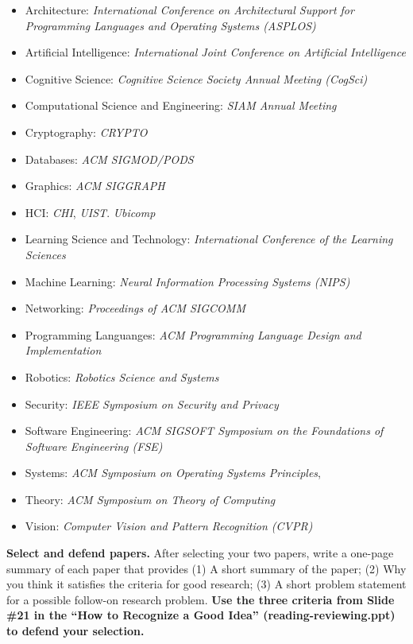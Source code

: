 \documentclass[11pt]{article}
\begin{document}
\begin{itemize}
\itemsep=-1.5pt
\item Architecture: {\em International Conference on
Architectural Support for Programming Languages and Operating Systems
(ASPLOS)}
\item Artificial Intelligence: {\em International Joint Conference on
  Artificial Intelligence}
\item Cognitive Science: {\em Cognitive Science Society Annual Meeting
  (CogSci)}
\item Computational Science and Engineering: {\em SIAM Annual Meeting}
\item Cryptography: {\em CRYPTO}
\item Databases: {\em ACM SIGMOD/PODS}
\item Graphics: {\em ACM SIGGRAPH}
\item HCI: {\em CHI}, {\em UIST}. {\em Ubicomp}
\item Learning Science and Technology: {\em International Conference of
  the Learning Sciences}
\item Machine Learning: {\em Neural Information Processing Systems
  (NIPS)}
\item Networking: {\em Proceedings of ACM SIGCOMM}
\item Programming Languanges: {\em ACM Programming Language Design and
  Implementation}
\item Robotics: {\em Robotics Science and Systems}
\item Security: {\em IEEE Symposium on Security and Privacy}
\item Software Engineering: {\em ACM SIGSOFT Symposium on the
  Foundations of Software Engineering (FSE)}
\item Systems: {\em ACM Symposium on Operating Systems Principles},
\item Theory: {\em ACM Symposium on Theory of Computing}
\item Vision: {\em Computer Vision and Pattern Recognition (CVPR)}
\end{itemize}

\noindent
{\bf Select and defend papers.}  After selecting your two papers, write
a one-page summary of each paper that provides (1) A short summary of
the paper; (2) Why you think it satisfies the criteria for good
research; (3) A short problem statement for a possible follow-on
research problem.  {\bf Use the three criteria from Slide \#21 in the
  ``How to Recognize a Good Idea'' (reading-reviewing.ppt) to defend
  your selection.}
\end{document}
